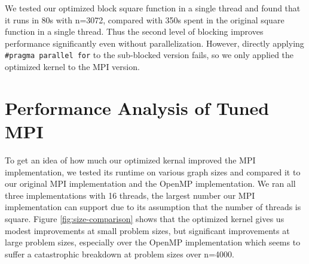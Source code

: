 \documentclass[11pt]{article}
\begin{document}
We tested our optimized block square function in a single thread and found that it runs in 80s with n=3072, compared with 350s spent in the original square function in a single thread. 
Thus the second level of blocking improves performance significantly even without parallelization. 
However, directly applying \texttt{\#pragma parallel for} to the sub-blocked version fails, so we only applied the optimized kernel to the MPI version.

\section{Performance Analysis of Tuned MPI}
To get an idea of how much our optimized kernal improved the MPI implementation, we tested its runtime on various graph sizes and compared it to our original MPI implementation and the OpenMP implementation.
We ran all three implementations with 16 threads, the largest number our MPI implementation can support due to its assumption that the number of threads is square.
Figure \ref{fig:size-comparison} shows that the optimized kernel gives us modest improvements at small problem sizes, but significant improvements at large problem sizes, especially over the OpenMP implementation which seems to suffer a catastrophic breakdown at problem sizes over n=4000.
\end{document}
